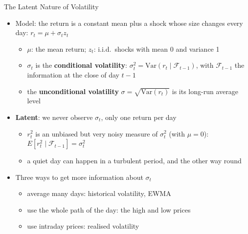 \begin{frame}{The Latent Nature of Volatility}
\itemsize{\small}
\begin{itemize}
    \item Model: the return is a constant mean plus a shock whose size changes every day: $r_t = \mu + \sigma_t z_t$
    \begin{itemize}
        \item $\mu$: the mean return; $z_t$: i.i.d.\ shocks with mean 0 and variance 1
        \item $\sigma_t$ is the \textbf{conditional volatility}: $\sigma_t^2 = \mathrm{Var}(r_t \mid \mathcal{F}_{t-1})$, with $\mathcal{F}_{t-1}$ the information at the close of day $t-1$
        \item the \textbf{unconditional volatility} $\sigma = \sqrt{\mathrm{Var}(r_t)}$ is its long-run average level
    \end{itemize}
    \item \textbf{Latent}: we never observe $\sigma_t$, only one return per day
    \begin{itemize}
        \item $r_t^2$ is an unbiased but very noisy measure of $\sigma_t^2$ (with $\mu = 0$): $E[r_t^2 \mid \mathcal{F}_{t-1}] = \sigma_t^2$
        \item a quiet day can happen in a turbulent period, and the other way round
    \end{itemize}
    \item Three ways to get more information about $\sigma_t$
    \begin{itemize}
        \item average many days: historical volatility, EWMA
        \item use the whole path of the day: the high and low prices
        \item use intraday prices: realised volatility
    \end{itemize}
\end{itemize}
\end{frame}

